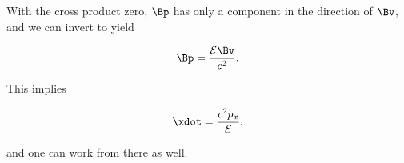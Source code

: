 {With the cross product zero, \(\Bp\) has only a component in the direction of \(\Bv\), and we can invert to yield

\begin{equation}\label{eqn:relativisticElectrodynamicsT3:180}
\Bp = \frac{\mathcal{E} \Bv}{c^2}.
\end{equation}

This implies

\begin{equation}\label{eqn:relativisticElectrodynamicsT3:200}
\xdot = \frac{c^2 p_x}{\mathcal{E}},
\end{equation}

and one can work from there as well.

} %
